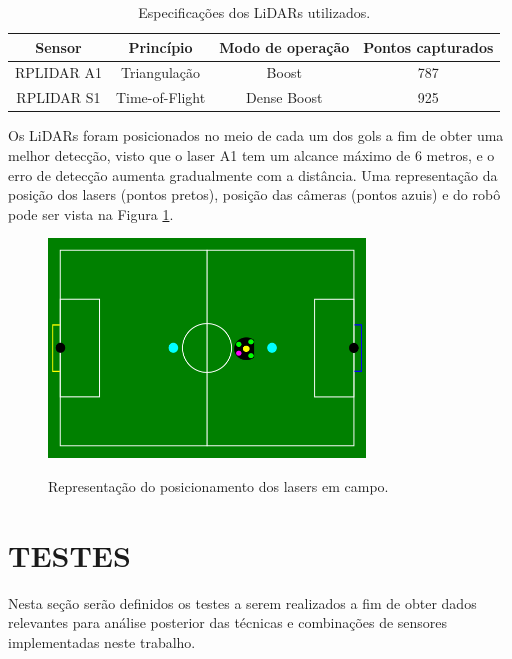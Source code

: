 \documentclass[acronym, symbols, table]{fei}
\begin{document}
	\begin{table}[!htb]
		\centering
		\caption{Especificações dos LiDARs utilizados.}
		\label{tbl:especificacoes_laser}
		\begin{tabular}{|c|c|c|c|}
			\hline
			Sensor 				& Princípio 		& Modo de operação 	& Pontos capturados\\ \hline
			RPLIDAR A1			& Triangulação 		& Boost 			& 787 \\ \hline
			RPLIDAR S1 			& Time-of-Flight 	& Dense Boost		& 925 \\ \hline
		\end{tabular}
	\end{table}

	Os LiDARs foram posicionados no meio de cada um dos gols a fim de obter uma melhor detecção, visto que o laser A1 tem um alcance máximo de 6 metros, e o erro de detecção aumenta gradualmente com a distância. Uma representação da posição dos lasers (pontos pretos), posição das câmeras (pontos azuis) e do robô pode ser vista na Figura \ref{fig:representacao_teste_lidar}.
	
	\begin{figure}[!htb]
		\centering
		\caption{Representação do posicionamento dos lasers em campo.}
		\includegraphics[width=0.75\textwidth]{representacao_teste_lidar_cameras.png}
		\label{fig:representacao_teste_lidar}
	\end{figure}
	
	\section{TESTES}\label{sec:metodologia_testes}
	
		Nesta seção serão definidos os testes a serem realizados a fim de obter dados relevantes para análise posterior das técnicas e combinações de sensores implementadas neste trabalho.
		
\end{document}
